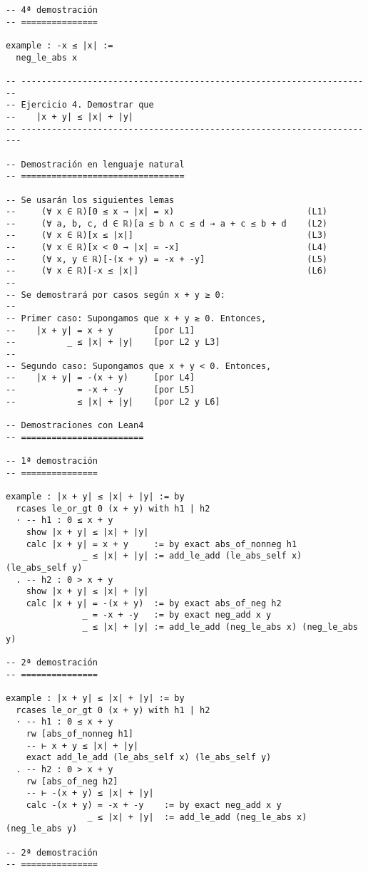 \begin{verbatim}
-- 4ª demostración
-- ===============

example : -x ≤ |x| :=
  neg_le_abs x

-- ---------------------------------------------------------------------
-- Ejercicio 4. Demostrar que
--    |x + y| ≤ |x| + |y|
-- ----------------------------------------------------------------------

-- Demostración en lenguaje natural
-- ================================

-- Se usarán los siguientes lemas
--     (∀ x ∈ ℝ)[0 ≤ x → |x| = x)                          (L1)
--     (∀ a, b, c, d ∈ ℝ)[a ≤ b ∧ c ≤ d → a + c ≤ b + d    (L2)
--     (∀ x ∈ ℝ)[x ≤ |x|]                                  (L3)
--     (∀ x ∈ ℝ)[x < 0 → |x| = -x]                         (L4)
--     (∀ x, y ∈ ℝ)[-(x + y) = -x + -y]                    (L5)
--     (∀ x ∈ ℝ)[-x ≤ |x|]                                 (L6)
--
-- Se demostrará por casos según x + y ≥ 0:
--
-- Primer caso: Supongamos que x + y ≥ 0. Entonces,
--    |x + y| = x + y        [por L1]
--          _ ≤ |x| + |y|    [por L2 y L3]
--
-- Segundo caso: Supongamos que x + y < 0. Entonces,
--    |x + y| = -(x + y)     [por L4]
--            = -x + -y      [por L5]
--            ≤ |x| + |y|    [por L2 y L6]

-- Demostraciones con Lean4
-- ========================

-- 1ª demostración
-- ===============

example : |x + y| ≤ |x| + |y| := by
  rcases le_or_gt 0 (x + y) with h1 | h2
  · -- h1 : 0 ≤ x + y
    show |x + y| ≤ |x| + |y|
    calc |x + y| = x + y     := by exact abs_of_nonneg h1
               _ ≤ |x| + |y| := add_le_add (le_abs_self x) (le_abs_self y)
  . -- h2 : 0 > x + y
    show |x + y| ≤ |x| + |y|
    calc |x + y| = -(x + y)  := by exact abs_of_neg h2
               _ = -x + -y   := by exact neg_add x y
               _ ≤ |x| + |y| := add_le_add (neg_le_abs x) (neg_le_abs y)

-- 2ª demostración
-- ===============

example : |x + y| ≤ |x| + |y| := by
  rcases le_or_gt 0 (x + y) with h1 | h2
  · -- h1 : 0 ≤ x + y
    rw [abs_of_nonneg h1]
    -- ⊢ x + y ≤ |x| + |y|
    exact add_le_add (le_abs_self x) (le_abs_self y)
  . -- h2 : 0 > x + y
    rw [abs_of_neg h2]
    -- ⊢ -(x + y) ≤ |x| + |y|
    calc -(x + y) = -x + -y    := by exact neg_add x y
                _ ≤ |x| + |y|  := add_le_add (neg_le_abs x) (neg_le_abs y)

-- 2ª demostración
-- ===============


\end{verbatim}
